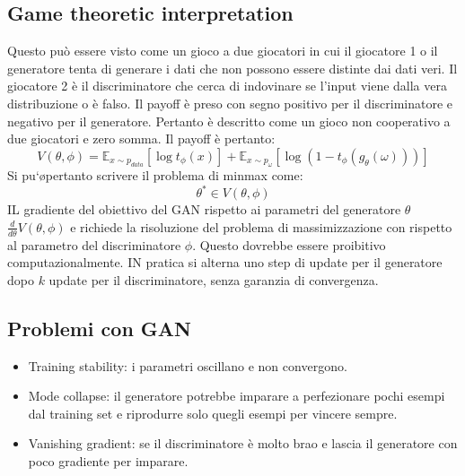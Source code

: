 	\subsection{Game theoretic interpretation}
	Questo pu\`o essere visto come un gioco a due giocatori in cui il giocatore 1 o il generatore tenta di generare i dati che non possono essere distinte dai dati veri.
	Il giocatore 2 \`e il discriminatore che cerca di indovinare se l'input viene dalla vera distribuzione o \`e falso.
	Il payoff \`e preso con segno positivo per il discriminatore e negativo per il generatore.
	Pertanto \`e descritto come un gioco non cooperativo a due giocatori e zero somma.
	Il payoff \`e pertanto:
	$$V(\theta,\phi) = \mathbb{E}_{x\sim p_{data}}[\log t_\phi(x)]+\mathbb{E}_{x\sim p_\omega}[\log(1-t_\phi(g_\theta(\omega)))]$$
	Si pu`\o pertanto scrivere il problema di minmax come:
	$$\theta^*\in V(\theta,\phi)$$
	IL gradiente del obiettivo del GAN rispetto ai parametri del generatore $\theta$ $\frac{d}{d\theta}V(\theta,\phi)$ e richiede la risoluzione del problema di massimizzazione con rispetto al parametro del discriminatore $\phi$.
	Questo dovrebbe essere proibitivo computazionalmente.
	IN pratica si alterna uno step di update per il generatore dopo $k$ update per il discriminatore, senza garanzia di convergenza.

	\subsection{Problemi con GAN}
	\begin{itemize}
		\item Training stability: i parametri oscillano e non convergono.
		\item Mode collapse: il generatore potrebbe imparare a perfezionare pochi esempi dal training set e riprodurre solo quegli esempi per vincere sempre.
		\item Vanishing gradient: se il discriminatore \`e molto brao e lascia il generatore con poco gradiente per imparare.
	\end{itemize}
